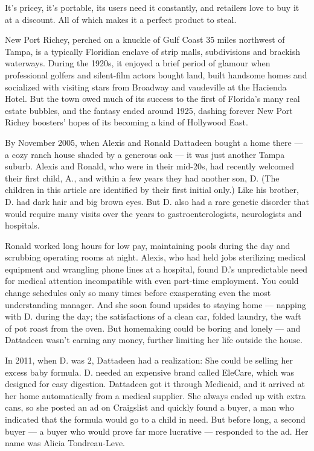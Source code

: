 It's pricey, it's portable, its users need it constantly, and retailers
love to buy it at a discount. All of which makes it a perfect product to
steal.

New Port Richey, perched on a knuckle of Gulf Coast 35 miles northwest
of Tampa, is a typically Floridian enclave of strip malls, subdivisions
and brackish waterways. During the 1920s, it enjoyed a brief period of
glamour when professional golfers and silent-film actors bought land,
built handsome homes and socialized with visiting stars from Broadway
and vaudeville at the Hacienda Hotel. But the town owed much of its
success to the first of Florida's many real estate bubbles, and the
fantasy ended around 1925, dashing forever New Port Richey boosters'
hopes of its becoming a kind of Hollywood East.

By November 2005, when Alexis and Ronald Dattadeen bought a home there
--- a cozy ranch house shaded by a generous oak --- it was just another
Tampa suburb. Alexis and Ronald, who were in their mid-20s, had recently
welcomed their first child, A., and within a few years they had another
son, D. (The children in this article are identified by their first
initial only.) Like his brother, D. had dark hair and big brown eyes.
But D. also had a rare genetic disorder that would require many visits
over the years to gastroenterologists, neurologists and hospitals.

Ronald worked long hours for low pay, maintaining pools during the day
and scrubbing operating rooms at night. Alexis, who had held jobs
sterilizing medical equipment and wrangling phone lines at a hospital,
found D.'s unpredictable need for medical attention incompatible with
even part-time employment. You could change schedules only so many times
before exasperating even the most understanding manager. And she soon
found upsides to staying home --- napping with D. during the day; the
satisfactions of a clean car, folded laundry, the waft of pot roast from
the oven. But homemaking could be boring and lonely --- and Dattadeen
wasn't earning any money, further limiting her life outside the house.

In 2011, when D. was 2, Dattadeen had a realization: She could be
selling her excess baby formula. D. needed an expensive brand called
EleCare, which was designed for easy digestion. Dattadeen got it through
Medicaid, and it arrived at her home automatically from a medical
supplier. She always ended up with extra cans, so she posted an ad on
Craigslist and quickly found a buyer, a man who indicated that the
formula would go to a child in need. But before long, a second buyer ---
a buyer who would prove far more lucrative --- responded to the ad. Her
name was Alicia Tondreau-Leve.

